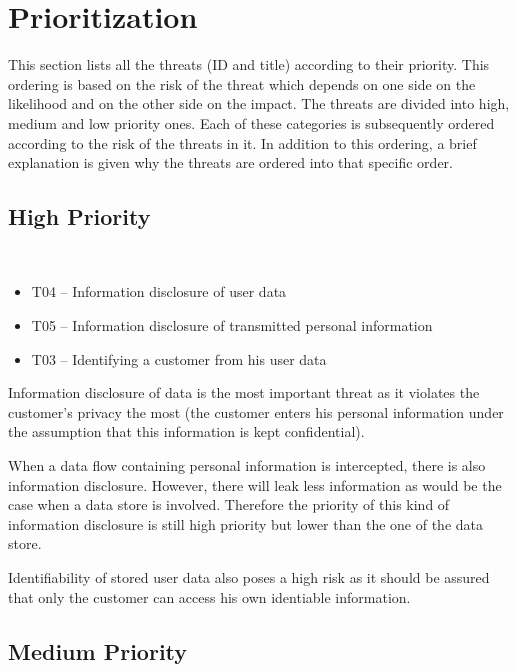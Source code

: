 \section{Prioritization}
\label{sec:prioritization}

\npar This section lists all the threats (ID and title) according to their
priority. This ordering is based on the risk of the threat which depends on one
side on the likelihood and on the other side on the impact. The threats are
divided into high, medium and low priority ones. Each of these categories is
subsequently ordered according to the risk of the threats in it. In addition to
this ordering, a brief explanation is given why the threats are ordered into
that specific order.

\subsection{High Priority}

\ %

\begin{itemize}
  \item T04 -- Information disclosure of user data
  \item T05 -- Information disclosure of transmitted personal information
  \item T03 -- Identifying a customer from his user data  
\end{itemize}

\npar Information disclosure of data is the most important threat as it violates
the customer's privacy the most (the customer enters his personal information
under the assumption that this information is kept confidential).

\npar When a data flow containing personal information is intercepted, there is
also information disclosure. However, there will leak less information as would
be the case when a data store is involved. Therefore the priority of this kind
of information disclosure is still high priority but lower than the one of the
data store.

\npar Identifiability of stored user data also poses a high risk as it should be
assured that only the customer can access his own identiable information.

\subsection{Medium Priority}

\ %

